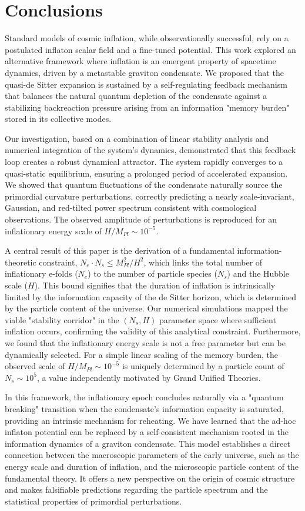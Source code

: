 \documentclass[]{article}
\begin{document}
\section{Conclusions}
\label{sec:conclusions}
Standard models of cosmic inflation, while observationally successful, rely on a postulated inflaton scalar field and a fine-tuned potential. This work explored an alternative framework where inflation is an emergent property of spacetime dynamics, driven by a metastable graviton condensate. We proposed that the quasi-de Sitter expansion is sustained by a self-regulating feedback mechanism that balances the natural quantum depletion of the condensate against a stabilizing backreaction pressure arising from an information "memory burden" stored in its collective modes.

Our investigation, based on a combination of linear stability analysis and numerical integration of the system's dynamics, demonstrated that this feedback loop creates a robust dynamical attractor. The system rapidly converges to a quasi-static equilibrium, ensuring a prolonged period of accelerated expansion. We showed that quantum fluctuations of the condensate naturally source the primordial curvature perturbations, correctly predicting a nearly scale-invariant, Gaussian, and red-tilted power spectrum consistent with cosmological observations. The observed amplitude of perturbations is reproduced for an inflationary energy scale of $H/M_{Pl} \sim 10^{-5}$.

A central result of this paper is the derivation of a fundamental information-theoretic constraint, $N_e \cdot N_s \leq M_{Pl}^2/H^2$, which links the total number of inflationary e-folds ($N_e$) to the number of particle species ($N_s$) and the Hubble scale ($H$). This bound signifies that the duration of inflation is intrinsically limited by the information capacity of the de Sitter horizon, which is determined by the particle content of the universe. Our numerical simulations mapped the viable "stability corridor" in the $(N_s, H)$ parameter space where sufficient inflation occurs, confirming the validity of this analytical constraint. Furthermore, we found that the inflationary energy scale is not a free parameter but can be dynamically selected. For a simple linear scaling of the memory burden, the observed scale of $H/M_{Pl} \sim 10^{-5}$ is uniquely determined by a particle count of $N_s \sim 10^5$, a value independently motivated by Grand Unified Theories.

In this framework, the inflationary epoch concludes naturally via a "quantum breaking" transition when the condensate's information capacity is saturated, providing an intrinsic mechanism for reheating. We have learned that the ad-hoc inflaton potential can be replaced by a self-consistent mechanism rooted in the information dynamics of a graviton condensate. This model establishes a direct connection between the macroscopic parameters of the early universe, such as the energy scale and duration of inflation, and the microscopic particle content of the fundamental theory. It offers a new perspective on the origin of cosmic structure and makes falsifiable predictions regarding the particle spectrum and the statistical properties of primordial perturbations.


{}

\end{document}
